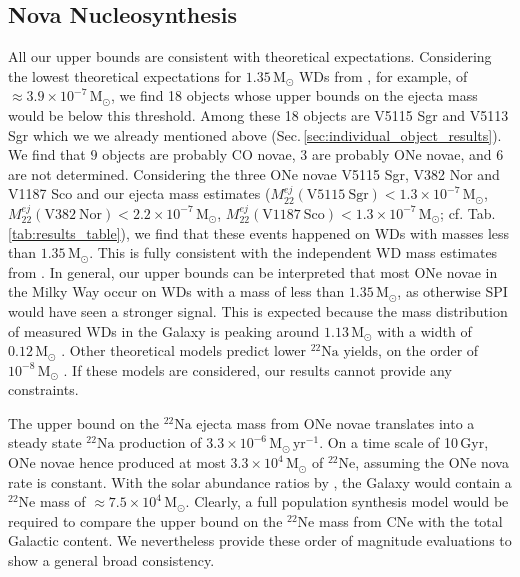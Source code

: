 \documentclass{aa}
\newcommand{\mrm}[1]{\mathrm{#1}}
\newcommand{\nuc}[2]{$\mrm{^{#2}#1}$}
\begin{document}
\subsection{Nova Nucleosynthesis}\label{sec:nova_nucleosynthesis}
%
All our upper bounds are consistent with theoretical expectations.
%
Considering the lowest theoretical expectations for $1.35\,\mrm{M_{\odot}}$ WDs from \citet{abcdefgh}, for example, of $\approx 3.9 \times 10^{-7}\,\mrm{M_{\odot}}$, we find 18 objects whose upper bounds on the ejecta mass would be below this threshold.
%
Among these 18 objects are V5115 Sgr and V5113 Sgr which we we already mentioned above (Sec.\,\ref{sec:individual_object_results}).
%
We find that $9$ objects are probably CO novae, $3$ are probably ONe novae, and $6$ are not determined.
%
Considering the three ONe novae V5115 Sgr, V382 Nor and V1187 Sco and our ejecta mass estimates ($M_{22}^{ej}(\mrm{V5115~Sgr}) < 1.3 \times 10^{-7}\,\mrm{M_{\odot}}$, $M_{22}^{ej}(\mrm{V382~Nor}) < 2.2 \times 10^{-7}\,\mrm{M_{\odot}}$, $M_{22}^{ej}(\mrm{V1187~Sco}) < 1.3 \times 10^{-7}\,\mrm{M_{\odot}}$; cf. Tab.\,\ref{tab:results_table}), we find that these events happened on WDs with masses less than $1.35\,\mrm{M_{\odot}}$.
%
This is fully consistent with the independent WD mass estimates from \citet{Shara2018_WDmasses}.
%
In general, our upper bounds can be interpreted that most ONe novae in the Milky Way occur on WDs with a mass of less than $1.35\,\mrm{M_{\odot}}$, as otherwise SPI would have seen a stronger signal.
%
This is expected because the mass distribution of measured WDs in the Galaxy is peaking around $1.13\,\mrm{M_{\odot}}$ with a width of $0.12\,\mrm{M_{\odot}}$ \citep{Shara2018_WDmasses}.
%
Other theoretical models predict lower \nuc{Na}{22} yields, on the order of $10^{-8}\,\mrm{M_{\odot}}$ \citep[e.g.,][]{Jose1998_novae}.
%
If these models are considered, our results cannot provide any constraints.

The upper bound on the \nuc{Na}{22} ejecta mass from ONe novae translates into a steady state \nuc{Na}{22} production of $3.3 \times 10^{-6}\,\mrm{M_{\odot}\,yr^{-1}}$.
%
On a time scale of 10\,Gyr, ONe novae hence produced at most $3.3 \times 10^4\,\mrm{M_{\odot}}$ of \nuc{Ne}{22}, assuming the ONe nova rate is constant.
%
With the solar abundance ratios by \citet{Lodders2003_abundances}, the Galaxy would contain a \nuc{Ne}{22} mass of $\approx 7.5 \times 10^4\,\mrm{M_{\odot}}$.
%
Clearly, a full population synthesis model would be required to compare the upper bound on the \nuc{Ne}{22} mass from CNe with the total Galactic content.
%
We nevertheless provide these order of magnitude evaluations to show a general broad consistency.
\end{document}
